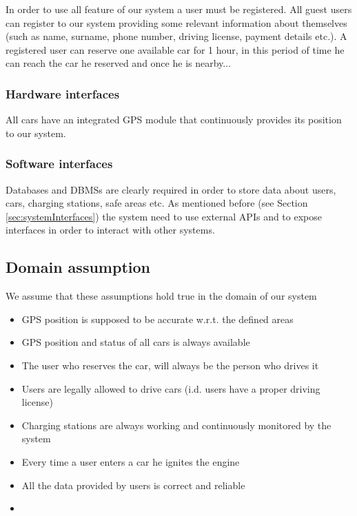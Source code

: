 	In order to use all feature of our system a user must be registered. All guest users can register to our system providing some relevant information about themselves (such as name, surname, phone number, driving license, payment details etc.). A registered user can reserve one available car for 1 hour, in this period of time he can reach the car he reserved and once he is nearby...

\subsubsection{Hardware interfaces}
	All cars have an integrated GPS module that continuously provides its position to our system.

\subsubsection{Software interfaces}
	Databases and DBMSs are clearly required in order to store data about users, cars, charging stations, safe areas etc.
	As mentioned before (see Section \ref{sec:systemInterfaces}) the system need to use external APIs and to expose interfaces in order to interact with other systems.
	
\subsection{Domain assumption}
	We assume that these assumptions hold true in the domain of our system 
	\begin{itemize}
		\item GPS position is supposed to be accurate w.r.t. the defined areas
		\item GPS position and status of all cars is always available
		\item The user who reserves the car, will always be the person who drives it
		\item Users are legally allowed to drive cars (i.d. users have a proper driving license)
		\item Charging stations are always working and continuously monitored by the system
		\item Every time a user enters a car he ignites the engine
		\item All the data provided by users is correct and reliable
		\item 
	\end{itemize}